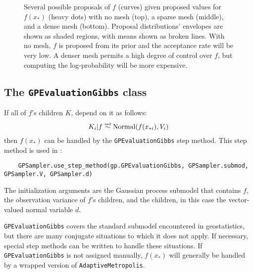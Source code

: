 \begin{figure}
    \centering
    \caption{Several possible proposals of $f$ (curves) given proposed values for $f(x_*)$ (heavy dots) with no mesh (top), a sparse mesh (middle), and a dense mesh (bottom). Proposal distributions' envelopes are shown as shaded regions, with means shown as broken lines. With no mesh, $f$ is proposed from its prior and the acceptance rate will be very low. A denser mesh permits a high degree of control over $f$, but computing the log-probability will be more expensive.}
    \label{fig:meshpropose}
\end{figure}

\subsection{The \texttt{GPEvaluationGibbs} class} 
If all of $f$'s children $K$, depend on it as follows:
\begin{eqnarray*}
    K_i|f \stackrel{\textup{\tiny ind}}{\sim} \textup{Normal}(f(x_{*i}),V_i)
\end{eqnarray*}
then $f(x_*)$ can be handled by the \texttt{GPEvaluationGibbs} step method. This step method is used in :
\begin{verbatim}
    GPSampler.use_step_method(gp.GPEvaluationGibbs, GPSampler.submod, GPSampler.V, GPSampler.d)
\end{verbatim}
The initialization arguments are the Gaussian process submodel that contains $f$, the observation variance of $f$'s children, and the children, in this case the vector-valued normal variable $d$. 

\texttt{GPEvaluationGibbs} covers the standard submodel encountered in geostatistics, but there are many conjugate situations to which it does not apply. If necessary, special step methods can be written to handle these situations. If \texttt{GPEvaluationGibbs} is not assigned manually, $f(x_*)$ will generally be handled by a wrapped version of \texttt{AdaptiveMetropolis}.





